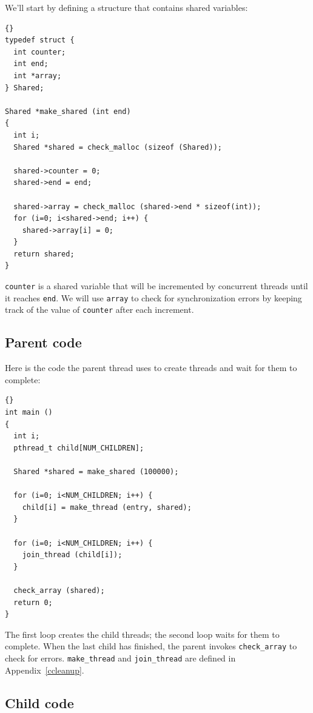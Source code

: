 \documentclass{book}
\begin{document}
We'll start by defining a structure that contains shared
variables:

\begin{latin}
\begin{lstlisting}[title={}]{}
typedef struct {
  int counter;
  int end;
  int *array;
} Shared;

Shared *make_shared (int end)
{
  int i;
  Shared *shared = check_malloc (sizeof (Shared));

  shared->counter = 0;
  shared->end = end;

  shared->array = check_malloc (shared->end * sizeof(int));
  for (i=0; i<shared->end; i++) {
    shared->array[i] = 0;
  }
  return shared;
}
\end{lstlisting}
\end{latin}

{\tt counter} is a shared variable that will be incremented by
concurrent threads until it reaches {\tt end}.  We will use
{\tt array} to check for synchronization errors by keeping track
of the value of {\tt counter} after each increment.

\subsection{Parent code}

Here is the code the parent thread uses to create threads
and wait for them to complete:

\begin{latin}
\begin{lstlisting}[title={}]{}
int main ()
{
  int i;
  pthread_t child[NUM_CHILDREN];

  Shared *shared = make_shared (100000);

  for (i=0; i<NUM_CHILDREN; i++) {
    child[i] = make_thread (entry, shared);
  }

  for (i=0; i<NUM_CHILDREN; i++) {
    join_thread (child[i]);
  }

  check_array (shared);
  return 0;
}
\end{lstlisting}
\end{latin}

The first loop creates the child threads; the second loop waits
for them to complete.  When the last child has finished, the parent
invokes {\tt check\_array} to check for errors.
{\tt make\_thread} and {\tt join\_thread} are defined in
Appendix~\ref{ccleanup}.

\subsection{Child code}
\end{document}
